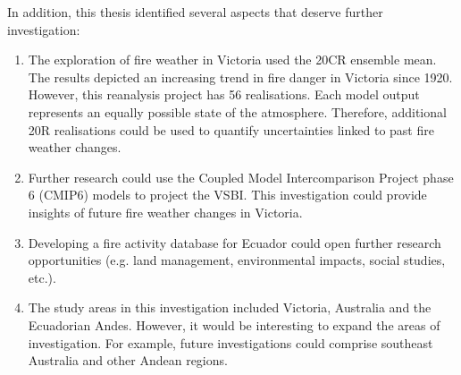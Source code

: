 In addition, this thesis identified several aspects that deserve further
investigation:
\begin{enumerate}
\item The exploration of fire weather in Victoria used the 20CR ensemble
mean. The results depicted an increasing trend in fire danger in Victoria
since 1920. However, this reanalysis project has 56 realisations.
Each model output represents an equally possible state of the atmosphere.
Therefore, additional 20R realisations could be used to quantify uncertainties
linked to past fire weather changes.
\item Further research could use the Coupled Model Intercomparison Project
phase 6 (CMIP6) models to project the VSBI. This investigation could
provide insights of future fire weather changes in Victoria.
\item Developing a fire activity database for Ecuador could open further
research opportunities (e.g. land management, environmental impacts,
social studies, etc.).
\item The study areas in this investigation included Victoria, Australia
and the Ecuadorian Andes. However, it would be interesting to expand
the areas of investigation. For example, future investigations could
comprise southeast Australia and other Andean regions.\end{enumerate}

